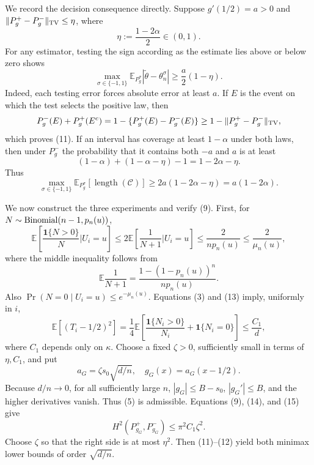 We record the decision consequence directly.  Suppose \(g'(1/2)=a>0\) and \(\|P_g^+-P_g^-\|_{\rm TV}\leq\eta\), where
\[
 \eta:=\frac{1-2\alpha}{2}\in(0,1).
\tag{10}
\]
For any estimator, testing the sign according as the estimate lies above or below zero shows
\[
 \max_{\sigma\in\{-1,1\}}
 \mathbb E_{P_g^\sigma}|\widetilde\theta-\theta_n^\sigma|
 \geq\frac a2(1-\eta).
\tag{11}
\]
Indeed, each testing error forces absolute error at least \(a\).  If \(E\) is the event on which the test selects the positive law, then
\[
 P_g^-(E)+P_g^+(E^c)
 =1-\{P_g^+(E)-P_g^-(E)\}
 \geq1-\|P_g^+-P_g^-\|_{\rm TV},
\]
which proves (11).  If an interval has coverage at least \(1-\alpha\) under both laws, then under \(P_g^-\) the probability that it contains both \(-a\) and \(a\) is at least
\[
 (1-\alpha)+(1-\alpha-\eta)-1=1-2\alpha-\eta.
\]
Thus
\[
 \max_{\sigma\in\{-1,1\}}
 \mathbb E_{P_g^\sigma}[\operatorname{length}(\mathcal C)]
 \geq2a(1-2\alpha-\eta)=a(1-2\alpha).
\tag{12}
\]

We now construct the three experiments and verify (9).  First, for \(N\sim{\rm Binomial}(n-1,p_n(u))\),
\[
 \mathbb E\!\left[\frac{\mathbf1\{N>0\}}N\mathrel{\Big|}U_i=u\right]
 \leq2\mathbb E\!\left[\frac1{N+1}\mathrel{\Big|}U_i=u\right]
 \leq\frac2{np_n(u)}\leq\frac2{\mu_n(u)},
\tag{13}
\]
where the middle inequality follows from
\[
 \mathbb E\frac1{N+1}
 =\frac{1-(1-p_n(u))^n}{np_n(u)}.
\]
Also \(\Pr(N=0\mid U_i=u)\leq e^{-\mu_n(u)}\).  Equations (3) and (13) imply, uniformly in \(i\),
\[
 \mathbb E\left[(T_i-1/2)^2\right]
 =\frac14\mathbb E\!\left[\frac{\mathbf1\{N_i>0\}}{N_i}
 +\mathbf1\{N_i=0\}\right]
 \leq\frac{C_1}{d},
\tag{14}
\]
where \(C_1\) depends only on \(\kappa\).  Choose a fixed \(\zeta>0\), sufficiently small in terms of \(\eta,C_1\), and put
\[
 a_G=\zeta s_0\sqrt{d/n},\quad g_G(x)=a_G(x-1/2).
\tag{15}
\]
Because \(d/n\to0\), for all sufficiently large \(n\), \(|g_G|\leq B-s_0\), \(|g_G'|\leq B\), and the higher derivatives vanish.  Thus (5) is admissible.  Equations (9), (14), and (15) give
\[
 H^2(P_{g_G}^+,P_{g_G}^-)\leq\pi^2C_1\zeta^2.
\tag{16}
\]
Choose \(\zeta\) so that the right side is at most \(\eta^2\).  Then (11)--(12) yield both minimax lower bounds of order \(\sqrt{d/n}\).

